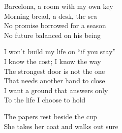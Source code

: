 \begin{lyrics}
Barcelona, a room with my own key\\
Morning bread, a desk, the sea\\
No promise borrowed for a season\\
No future balanced on his being

I won’t build my life on “if you stay”\\
I know the cost; I know the way\\
The strongest door is not the one\\
That needs another hand to close\\
I want a ground that answers only\\
To the life I choose to hold

The papers rest beside the cup\\
She takes her coat and walks out sure
\end{lyrics}

